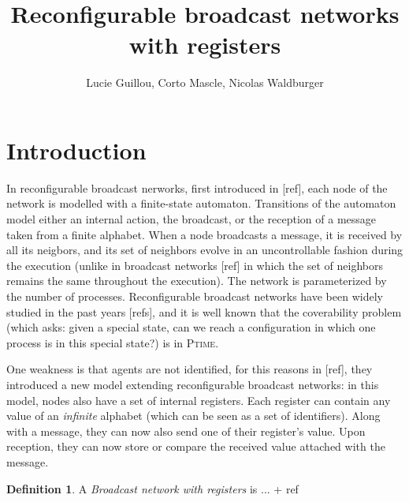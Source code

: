 \documentclass{article}
\title{Reconfigurable broadcast networks with registers}
\author{Lucie Guillou, Corto Mascle, Nicolas Waldburger}
\date{}
\theoremstyle{definition}
\newtheorem{definition}[theorem]{Definition}
\begin{document}
	
	\maketitle
	
	\section{Introduction}
	
	
	
	In reconfigurable broadcast nerworks, first introduced in [ref], each node of the network is modelled with a finite-state automaton. Transitions of the automaton model either an internal action, the broadcast, or the reception of a message taken from a finite alphabet. When a node broadcasts a message, it is received by all its neigbors, and its set of neighbors evolve in an uncontrollable fashion during the execution (unlike in broadcast networks [ref] in which the set of neighbors remains the same throughout the execution). The network is parameterized by the number of processes. Reconfigurable broadcast networks have been widely studied in the past years [refs], and it is well known that the coverability problem (which asks: given a special state, can we reach a configuration in which one process is in this special state?) is in \textsc{Ptime}.
	
	One weakness is that agents are not identified, for this reasons in [ref], they introduced a new model extending reconfigurable broadcast networks: in this model, nodes also have a set of internal registers. Each register can contain any value of an \emph{infinite} alphabet (which can be seen as a set of identifiers). Along with a message, they can now also send one of their register's value. Upon reception, they can now store or compare the received value attached with the message.
	
	\begin{definition}
		A \emph{Broadcast network with registers} is ... + ref
	\end{definition}
	
\end{document}

